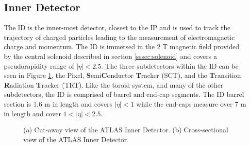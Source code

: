	\subsection{Inner Detector}\label{ssec:ID}
		The ID is the inner-most detector, closest to the IP and is used to track the trajectory of charged particles leading to the measurement of electromagnetic charge and momentum. The ID is immersed in the 2 T magnetic field provided by the central solenoid described in section \ref{sssec:solenoid} and covers a pseudorapidity range of $|\eta|<2.5$. The three subdetectors within the ID can be seen in Figure \ref{fig:ATLAS-ID}, the Pixel, \textbf{S}emi\textbf{C}onductor \textbf{T}racker (SCT), and the \textbf{T}ransition \textbf{R}adiation \textbf{T}racker (TRT). Like the toroid system, and many of the other subdetectors, the ID is comprised of barrel and end-cap segments. The ID barrel section is 1.6 m in length and covers $|\eta|<1$ while the end-caps measure over 7 m in length and cover $1 < |\eta| < 2.5$. 


		\begin{figure}[!h]
		\centering
		\caption{\label{fig:ATLAS-ID} (a) Cut-away view of the ATLAS Inner Detector. (b) Cross-sectional view of the ATLAS Inner Detector.}
		\end{figure}

